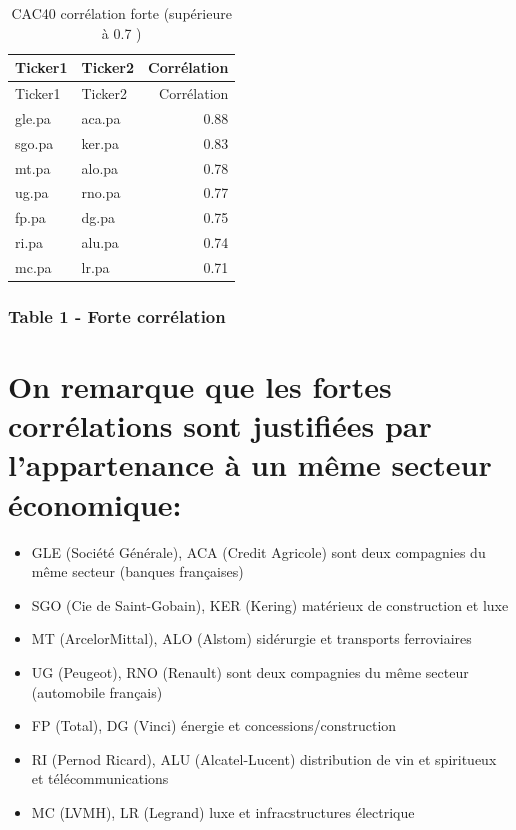 \documentclass[
]{article}
\providecommand{\tightlist}{%
  \setlength{\itemsep}{0pt}\setlength{\parskip}{0pt}}
\begin{document}
\begin{longtable}[]{@{}llr@{}}
\caption{CAC40 corrélation forte (supérieure à 0.7 )}\tabularnewline
\toprule
Ticker1 & Ticker2 & Corrélation\tabularnewline
\midrule
\endfirsthead
\toprule
Ticker1 & Ticker2 & Corrélation\tabularnewline
\midrule
\endhead
gle.pa & aca.pa & 0.88\tabularnewline
sgo.pa & ker.pa & 0.83\tabularnewline
mt.pa & alo.pa & 0.78\tabularnewline
ug.pa & rno.pa & 0.77\tabularnewline
fp.pa & dg.pa & 0.75\tabularnewline
ri.pa & alu.pa & 0.74\tabularnewline
mc.pa & lr.pa & 0.71\tabularnewline
\bottomrule
\end{longtable}

\hypertarget{table-1---forte-corruxe9lation}{%
\subsubsection{Table 1 - Forte
corrélation}\label{table-1---forte-corruxe9lation}}

\hypertarget{on-remarque-que-les-fortes-corruxe9lations-sont-justifiuxe9es-par-lappartenance-uxe0-un-muxeame-secteur-uxe9conomique}{%
\section{On remarque que les fortes corrélations sont justifiées par
l'appartenance à un même secteur
économique:}\label{on-remarque-que-les-fortes-corruxe9lations-sont-justifiuxe9es-par-lappartenance-uxe0-un-muxeame-secteur-uxe9conomique}}

\begin{itemize}
\tightlist
\item
  GLE (Société Générale), ACA (Credit Agricole) sont deux compagnies du
  même secteur (banques françaises)
\item
  SGO (Cie de Saint-Gobain), KER (Kering) matérieux de construction et
  luxe
\item
  MT (ArcelorMittal), ALO (Alstom) sidérurgie et transports ferroviaires
\item
  UG (Peugeot), RNO (Renault) sont deux compagnies du même secteur
  (automobile français)
\item
  FP (Total), DG (Vinci) énergie et concessions/construction
\item
  RI (Pernod Ricard), ALU (Alcatel-Lucent) distribution de vin et
  spiritueux et télécommunications
\item
  MC (LVMH), LR (Legrand) luxe et infracstructures électrique
\end{itemize}
\end{document}
